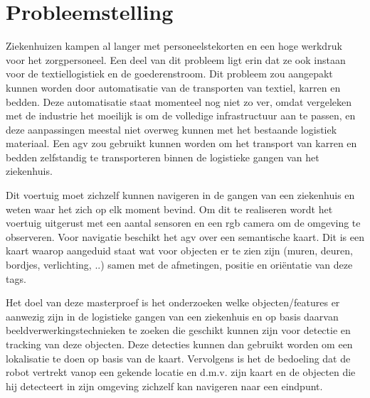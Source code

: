 
\chapter{Probleemstelling}

Ziekenhuizen kampen al langer met personeelstekorten en een hoge werkdruk voor het zorgpersoneel. Een deel van dit probleem ligt erin dat ze ook instaan voor de textiellogistiek en de goederenstroom.
Dit probleem zou aangepakt kunnen worden door automatisatie van de transporten van textiel, karren en bedden. Deze automatisatie staat momenteel nog niet zo ver, omdat vergeleken met de industrie het moeilijk is om de volledige
infrastructuur aan te passen, en deze aanpassingen meestal niet overweg kunnen met het bestaande logistiek materiaal. Een \gls{agv} zou gebruikt kunnen worden om het transport van karren en bedden zelfstandig te transporteren binnen de logistieke gangen van het ziekenhuis.

Dit voertuig moet zichzelf kunnen navigeren in de gangen van een ziekenhuis en weten waar het zich op elk moment bevind. Om dit te realiseren 
wordt het voertuig uitgerust met een aantal sensoren en een \gls{rgb} camera om de omgeving te observeren. Voor navigatie beschikt het \gls{agv}
over een semantische kaart. Dit is een kaart waarop aangeduid staat wat voor objecten er te zien zijn (muren, deuren, bordjes, verlichting, ..) samen met de afmetingen, positie en ori\"{e}ntatie van deze tags.


Het doel van deze masterproef is het onderzoeken welke objecten/features er aanwezig zijn in de logistieke gangen van een ziekenhuis en op basis daarvan
beeldverwerkingstechnieken te zoeken die geschikt kunnen zijn voor detectie en tracking van deze objecten. Deze detecties kunnen dan gebruikt worden om een lokalisatie te doen op basis van de kaart.
Vervolgens is het de bedoeling dat de robot vertrekt vanop een gekende locatie en d.m.v. zijn kaart en de objecten die hij detecteert in zijn omgeving zichzelf kan navigeren naar een eindpunt.